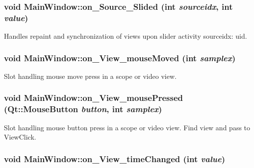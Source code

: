\hypertarget{class_main_window_dd08c6c56c319c5462f723df4716917a}{
\subsubsection[{on\_\-Source\_\-Slided}]{\setlength{\rightskip}{0pt plus 5cm}void MainWindow::on\_\-Source\_\-Slided (int {\em sourceidx}, \/  int {\em value})}}
\label{class_main_window_dd08c6c56c319c5462f723df4716917a}


Handles repaint and synchronization of views upon slider activity sourceidx: uid. 

\hypertarget{class_main_window_ecac34d763ecbc55584c31cff022f480}{
\subsubsection[{on\_\-View\_\-mouseMoved}]{\setlength{\rightskip}{0pt plus 5cm}void MainWindow::on\_\-View\_\-mouseMoved (int {\em samplex})}}
\label{class_main_window_ecac34d763ecbc55584c31cff022f480}


Slot handling mouse move press in a scope or video view. 

\hypertarget{class_main_window_f2a6e493949e61580eadf9ea2afb6fb0}{
\subsubsection[{on\_\-View\_\-mousePressed}]{\setlength{\rightskip}{0pt plus 5cm}void MainWindow::on\_\-View\_\-mousePressed (Qt::MouseButton {\em button}, \/  int {\em samplex})}}
\label{class_main_window_f2a6e493949e61580eadf9ea2afb6fb0}


Slot handling mouse button press in a scope or video view. Find view and pass to ViewClick. 

\hypertarget{class_main_window_f14f116b194e257cc62ab202b046bf8a}{
\subsubsection[{on\_\-View\_\-timeChanged}]{\setlength{\rightskip}{0pt plus 5cm}void MainWindow::on\_\-View\_\-timeChanged (int {\em value})}}
\label{class_main_window_f14f116b194e257cc62ab202b046bf8a}


